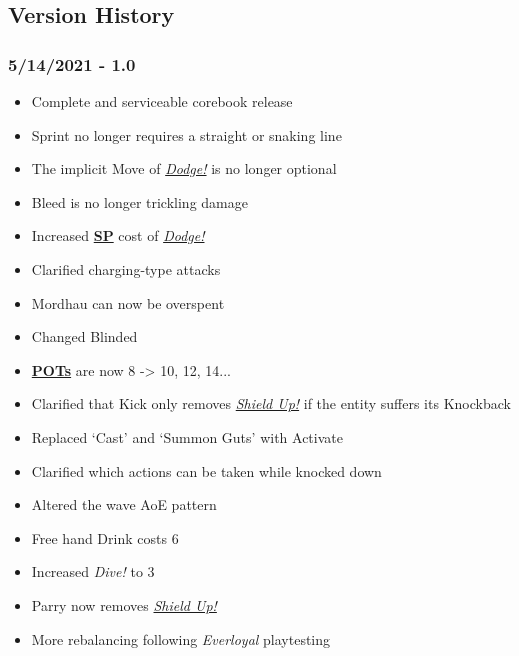 \documentclass[12pt]{article}
\newcommand{\refto}[1]{\hyperlink{#1}{\textbf{#1}}}
\newcommand{\reftoit}[1]{\hyperlink{#1}{\emph{#1}}}
\begin{document}
\begin{multicols*}{2}
\vfill

\pagebreak

\section{Version History}
\subsubsection*{5/14/2021 - 1.0}
\begin{itemize}
\item Complete and serviceable corebook release
\item Sprint no longer requires a straight or snaking line
\item The implicit Move of \reftoit{Dodge!} is no longer optional
\item Bleed is no longer trickling damage
\item Increased \refto{SP} cost of \reftoit{Dodge!}
\item Clarified charging-type attacks
\item Mordhau can now be overspent
\item Changed Blinded
\item \refto{POTs} are now 8 -> 10, 12, 14...
\item Clarified that Kick only removes \reftoit{Shield Up!} if the entity suffers its Knockback
\item Replaced ‘Cast’ and ‘Summon Guts’ with Activate
\item Clarified which actions can be taken while knocked down
\item Altered the wave AoE pattern
\item Free hand Drink costs 6
\item Increased \emph{Dive!} to 3
\item Parry now removes \reftoit{Shield Up!}
\item More rebalancing following \emph{Everloyal} playtesting
\end{itemize}

\end{multicols*}
\end{document}
